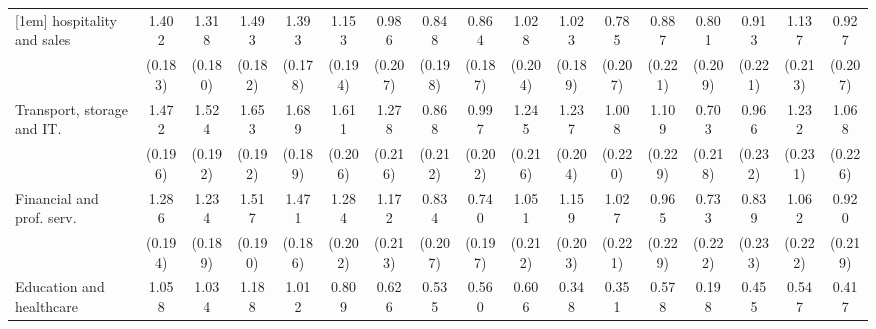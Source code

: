 {\begin{tabular}{l*{16}{c}}
[1em]
hospitality and sales&       1.402\sym{***}&       1.318\sym{***}&       1.493\sym{***}&       1.393\sym{***}&       1.153\sym{***}&       0.986\sym{***}&       0.848\sym{***}&       0.864\sym{***}&       1.028\sym{***}&       1.023\sym{***}&       0.785\sym{***}&       0.887\sym{***}&       0.801\sym{***}&       0.913\sym{***}&       1.137\sym{***}&       0.927\sym{***}\\
                    &     (0.183)         &     (0.180)         &     (0.182)         &     (0.178)         &     (0.194)         &     (0.207)         &     (0.198)         &     (0.187)         &     (0.204)         &     (0.189)         &     (0.207)         &     (0.221)         &     (0.209)         &     (0.221)         &     (0.213)         &     (0.207)         \\
[1em]
Transport, storage and IT.&       1.472\sym{***}&       1.524\sym{***}&       1.653\sym{***}&       1.689\sym{***}&       1.611\sym{***}&       1.278\sym{***}&       0.868\sym{***}&       0.997\sym{***}&       1.245\sym{***}&       1.237\sym{***}&       1.008\sym{***}&       1.109\sym{***}&       0.703\sym{**} &       0.966\sym{***}&       1.232\sym{***}&       1.068\sym{***}\\
                    &     (0.196)         &     (0.192)         &     (0.192)         &     (0.189)         &     (0.206)         &     (0.216)         &     (0.212)         &     (0.202)         &     (0.216)         &     (0.204)         &     (0.220)         &     (0.229)         &     (0.218)         &     (0.232)         &     (0.231)         &     (0.226)         \\
[1em]
Financial and prof. serv.&       1.286\sym{***}&       1.234\sym{***}&       1.517\sym{***}&       1.471\sym{***}&       1.284\sym{***}&       1.172\sym{***}&       0.834\sym{***}&       0.740\sym{***}&       1.051\sym{***}&       1.159\sym{***}&       1.027\sym{***}&       0.965\sym{***}&       0.733\sym{***}&       0.839\sym{***}&       1.062\sym{***}&       0.920\sym{***}\\
                    &     (0.194)         &     (0.189)         &     (0.190)         &     (0.186)         &     (0.202)         &     (0.213)         &     (0.207)         &     (0.197)         &     (0.212)         &     (0.203)         &     (0.221)         &     (0.229)         &     (0.222)         &     (0.233)         &     (0.222)         &     (0.219)         \\
[1em]
Education and healthcare&       1.058\sym{***}&       1.034\sym{***}&       1.188\sym{***}&       1.012\sym{***}&       0.809\sym{***}&       0.626\sym{**} &       0.535\sym{*}  &       0.560\sym{**} &       0.606\sym{**} &       0.348         &       0.351         &       0.578\sym{*}  &       0.198         &       0.455         &       0.547\sym{*}  &       0.417         \\

\end{tabular}}
